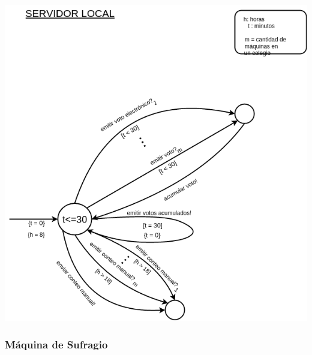 \documentclass[spanish, 10pt,a4paper]{article}
\numberwithin{equation}{section} %
\begin{document}
\vspace{\baselineskip}
    \begin{center}
                \includegraphics[scale=0.40]{imagenes/fsm/FSMservidorlocal.png}
                \\
                \vspace{1pt}
                \footnotesize\textit{}
        \end{center}
\vspace{\baselineskip}

\subsubsection{Máquina de Sufragio}
\end{document}
